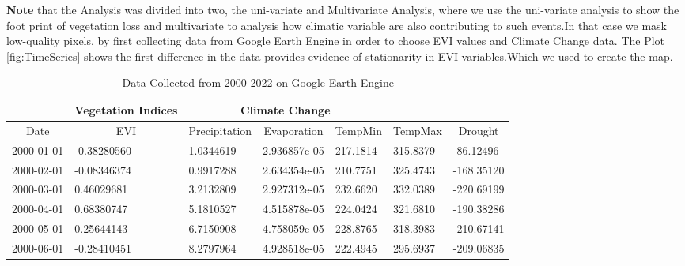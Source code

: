 \textbf{Note} that the Analysis was divided into two, the uni-variate and Multivariate Analysis, where we use the uni-variate analysis to show the foot print of vegetation loss and multivariate to analysis how climatic variable are also contributing to such events.In that case we mask low-quality pixels, by  first collecting data from Google Earth Engine in order to choose  EVI values and Climate Change data. The Plot \ref{fig:TimeSeries}  shows the first difference in the data provides evidence of stationarity in EVI variables.Which we used to create the map. 
\begin{table}[]
	\label{DataFrame}
	\caption{Data Collected from 2000-2022 on Google Earth Engine }
	\centering
	\begin{tabularx}{\textwidth}{@{}cllllll@{}}
		\toprule
		& \multicolumn{1}{c}{Vegetation Indices}   & \multicolumn{3}{c}{Climate Change}  \\ \midrule
		\multicolumn{1}{c}{Date} & \multicolumn{1}{c}{EVI} & \multicolumn{1}{c}{Precipitation} & \multicolumn{1}{c}{Evaporation} & \multicolumn{1}{c}{TempMin} & \multicolumn{1}{c}{TempMax} &\multicolumn{1}{c}{Drought}\\ \midrule
		
		
		2000-01-01&	-0.38280560&	1.0344619&	2.936857e-05&	217.1814&	315.8379&	-86.12496\\
		2000-02-01&	-0.08346374&	0.9917288&	2.634354e-05&	210.7751&	325.4743&	-168.35120\\
		2000-03-01&	0.46029681&	3.2132809&	2.927312e-05&	232.6620&	332.0389&	-220.69199\\
		2000-04-01&	0.68380747&	5.1810527&	4.515878e-05&	224.0424&	321.6810&	-190.38286\\
		2000-05-01&	0.25644143&	6.7150908&	4.758059e-05&	228.8765&	318.3983&	-210.67141\\
		2000-06-01&	-0.28410451&	8.2797964&	4.928518e-05&	222.4945&	295.6937&	-209.06835\\\bottomrule
		
	\end{tabularx}
\end{table}
